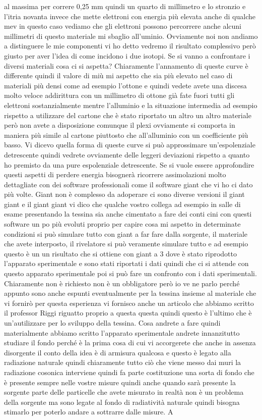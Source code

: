 al massima per correre 0,25 mm quindi un quarto di millimetro e lo stronzio e l'itria novanta invece che mette elettroni con energia più elevata anche di qualche mev in questo caso vediamo che gli elettroni possono percorrere anche alcuni millimetri di questo materiale mi sbaglio all'uminio. Ovviamente noi non andiamo a distinguere le mie componenti vi ho detto vedremo il risultato complessivo però giusto per aver l'idea di come incidono i due isotopi. Se si vanno a confrontare i diversi materiali cosa ci si aspetta? Chiaramente l'annamento di queste curve è differente quindi il valore di miù mi aspetto che sia più elevato nel caso di materiali più densi come ad esempio l'ottone e quindi vedete avete una discesa molto veloce addirittura con un millimetro di ottone già fate fuori tutti gli elettroni sostanzialmente mentre l'alluminio e la situazione intermedia ad esempio rispetto a utilizzare del cartone che è stato riportato un altro un altro materiale però non avete a disposizione comunque il plexi ovviamente si comporta in maniera più simile al cartone piuttosto che all'alluminio con un coefficiente più basso. Vi dicevo quella forma di queste curve si può approssimare un'espolenziale detrescente quindi vedrete ovviamente delle leggeri deviazioni rispetto a quanto ho premisto da una pure espolenziale detrescente. Se si vuole essere approfondire questi aspetti di perdere energia bisognerà ricorrere assimolazioni molto dettagliate con dei software professionali come il software giant che vi ho ci dato più volte. Giant non è complesso da adoperare ci sono diverse versioni il giant giant e il giant giant vi dico che qualche vostro collega ad esempio in salle di esame presentando la tessina sia anche cimentato a fare dei conti cini con questi software un po più evoluti proprio per capire cosa mi aspetto in determinate condizioni si può simulare tutto con giant a far fare dalla sorgente, il materiale che avete interposto, il rivelatore si può veramente simulare tutto e ad esempio questo è un un risultato che si ottiene con giant a 3 dove è stato riprodotto l'apparato sperimentale e sono stati riportati i dati quindi che ci si attende con questo apparato sperimentale poi si può fare un confronto con i dati sperimentali. Chiaramente non è richiesto non è un obbligatore però io ve ne parlo perché appunto sono anche espunti eventualmente per la tessina insieme al materiale che vi fornirò per questa esperienza vi fornisco anche un articolo che abbiamo scritto il professor Riggi riguatto proprio a questa questa quindi questo è l'ultimo che è un'autilizzare per lo sviluppo della tessina. Cosa andrete a fare quindi materialmente abbiamo scritto l'apparato sperimentale andrete innanzitutto studiare il fondo perché è la prima cosa di cui vi accorgerete che anche in assenza disorgente il conto della idea è di armisura qualcosa e questo è legato alla radiazione naturale quindi chiaramente tutto ciò che viene messo dai muri la radiazione cosonica interviene quindi fa parte costituzione una sorta di fondo che è presente sempre nelle vostre misure quindi anche quando sarà presente la sorgente parte delle particelle che avete misurato in realtà non è un problema della sorgente ma sono legate al fondo di radiatività naturale quindi bisogna stimarlo per poterlo andare a sottrarre dalle misure. A 